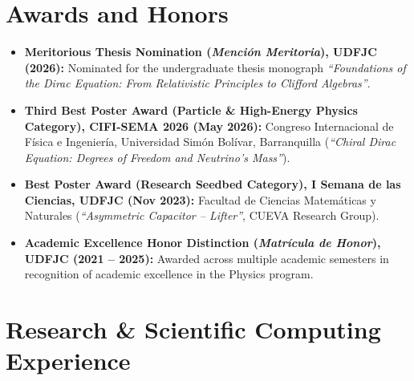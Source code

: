 \documentclass[10pt,a4paper]{article}
\begin{document}
\section{Awards and Honors}

\begin{itemize}
  \item \textbf{Meritorious Thesis Nomination (\textit{Menci\'on Meritoria}), UDFJC (2026):} Nominated for the undergraduate thesis monograph \textit{``Foundations of the Dirac Equation: From Relativistic Principles to Clifford Algebras''}.
  \item \textbf{Third Best Poster Award (Particle \& High-Energy Physics Category), CIFI-SEMA 2026 (May 2026):} Congreso Internacional de F\'isica e Ingenier\'ia, Universidad Sim\'on Bol\'ivar, Barranquilla (\textit{``Chiral Dirac Equation: Degrees of Freedom and Neutrino's Mass''}).
  \item \textbf{Best Poster Award (Research Seedbed Category), I Semana de las Ciencias, UDFJC (Nov 2023):} Facultad de Ciencias Matem\'aticas y Naturales (\textit{``Asymmetric Capacitor -- Lifter''}, CUEVA Research Group).
  \item \textbf{Academic Excellence Honor Distinction (\textit{Matr\'icula de Honor}), UDFJC (2021 -- 2025):} Awarded across multiple academic semesters in recognition of academic excellence in the Physics program.
\end{itemize}

\section{Research \& Scientific Computing Experience}
\end{document}
